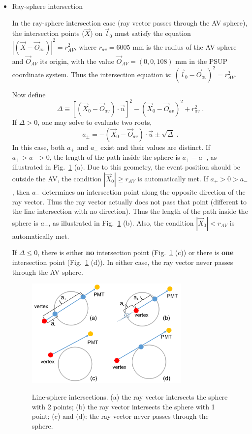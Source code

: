 \begin{itemize}
\item Ray-sphere intersection

In the ray-sphere intersection case (ray vector passes through the AV sphere), the intersection points ($\vec{X}$) on $\vec{l}_0$ must satisfy the equation $|(\vec{X}-\vec{O}_{av})|^2= r^2_{AV}$, where $r_{av}=6005$ mm is the radius of the AV sphere and $\vec{O}_{AV}$ its origin, with the value $\vec{O}_{AV} = (0,0,108)$ mm in the PSUP coordinate system. Thus the intersection equation is:
$(\vec{l}_0-\vec{O}_{av})^2 = r^2_{AV}$.

Now define 
\begin{equation}
\Delta \equiv {[(\vec{X}_0-\vec{O}_{av})\cdot\vec{u}]}^2-{(\vec{X}_0-\vec{O}_{av})}^2+r^2_{av} \; .
\end{equation}
If $\Delta>0$, one may solve to evaluate two roots,
\begin{equation}\label{eq:ray-sphere}
a_{\pm} = -(\vec{X}_0-\vec{O}_{av})\cdot\vec{u}\pm\sqrt{\Delta} \;.
\end{equation}
In this case, both $a_+$ and $a_-$ exist and their values are distinct. If $a_{+} > a_{-} > 0$, the length of the path inside the sphere is $a_{+} - a_{-} $, as illustrated in Fig.~\ref{line-sphere} (a). Due to this geometry, the event position should be outside the AV, the condition $|\vec{X}_0|\geq r_{AV}$ is automatically met. If $a_{+} > 0 >a_{-}$, then $a_{-}$ determines an intersection point along the opposite direction of the ray vector. Thus the ray vector actually does not pass that point (different to the line intersection with no direction). Thus the length of the path inside the sphere is $a_{+}$, as illustrated in Fig.~\ref{line-sphere} (b). Also, the condition $|\vec{X}_0| < r_{AV}$ is automatically met. 

If $\Delta\leq 0$, there is either {\bf no} intersection point (Fig.~\ref{line-sphere} (c)) or there is {\bf one} intersection point (Fig.~\ref{line-sphere} (d)). In either case, the ray vector never passes through the AV sphere.

\begin{figure}
	\centering
{\includegraphics[width=80mm]{line-sphere.png}}
\caption[Line-sphere intersections.]{Line-sphere intersections. (a) the ray vector intersects the sphere with 2 points; (b) the ray vector intersects the sphere with 1 point; (c) and (d): the ray vector never passes through the sphere.}\label{line-sphere}
\end{figure}


\end{itemize}
